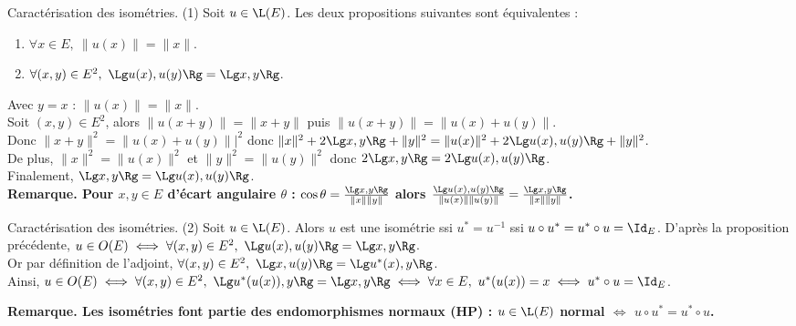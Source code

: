 \documentclass[11pt]{article}
\begin{document}
\begin{thm}{Caractérisation des isométries. (1)}{}
    Soit $u\in\L(E)$. Les deux propositions suivantes sont équivalentes :
    \begin{enumerate}
        \item $\forall x \in E, ~ \|u(x)\|=\|x\|$.
        \item $\forall (x,y) \in E^2, ~ \Lg u(x), u(y)\Rg = \Lg x,y\Rg$.
    \end{enumerate}
    \tcblower
     Avec $y=x$ : $\|u(x)\|=\|x\|$.\\
     Soit $(x,y)\in E^2$, alors $\|u(x+y)\|=\|x+y\|$ puis $\|u(x+y)\|=\|u(x)+u(y)\|$.\\
    Donc $\|x+y\|^2=\|u(x)+u(y)\||^2$ donc $\|x\|^2+2\Lg x,y\Rg + \|y\|^2=\|u(x)\|^2+2\Lg u(x),u(y)\Rg+\|y\|^2$.\\
    De plus, $\|x\|^2=\|u(x)\|^2$ et $\|y\|^2=\|u(y)\|^2$ donc $2\Lg x,y\Rg = 2\Lg u(x), u(y)\Rg$.\\
    Finalement, $\Lg x,y \Rg = \Lg u(x), u(y)\Rg$.\\
    \bf{Remarque.} Pour $x,y\in E$ d'écart angulaire $\theta$ : $\cos\theta=\frac{\Lg x,y \Rg}{\|x\|\|y\|}$ alors $\frac{\Lg u(x),u(y)\Rg}{\|u(x)\|\|u(y)\|}=\frac{\Lg x,y\Rg}{\|x\|\|y\|}$.
\end{thm}

\vspace*{-0.8cm}

\begin{thm}{Caractérisation des isométries. (2)}{}
    Soit $u\in \L(E)$. Alors $u$ est une isométrie ssi $u^* = u^{-1}$ ssi $u\circ u^* = u^* \circ u = \Id_E$.
    \tcblower
    D'après la proposition précédente, $u\in O(E)\iff \forall (x,y) \in E^2, ~ \Lg u(x),u(y)\Rg=\Lg x,y\Rg$.\\
    Or par définition de l'adjoint, $\forall (x,y)\in E^2, ~ \Lg x,u(y)\Rg = \Lg u^*(x),y\Rg$.\\
    Ainsi, $u\in O(E) \iff \forall (x,y)\in E^2, ~ \Lg u^*(u(x)), y \Rg = \Lg x,y\Rg \iff \forall x \in E, ~ u^*(u(x))=x \iff u^*\circ u = \Id_E$.
\end{thm}

\vspace*{-0.8cm}

\bf{Remarque.} Les isométries font partie des endomorphismes normaux (HP) : $u\in\L(E)$ normal $\iff$ $u\circ u^* = u^* \circ u$.
\end{document}
